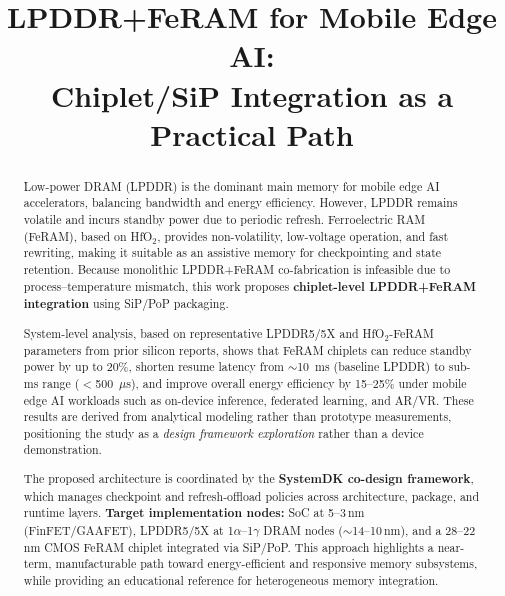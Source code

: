 \documentclass[10pt,conference]{IEEEtran}
\title{LPDDR+FeRAM for Mobile Edge AI:\\
Chiplet/SiP Integration as a Practical Path}
\author{%
  \IEEEauthorblockN{Shinichi Samizo}%
  \IEEEauthorblockA{Independent Semiconductor Researcher\\
  Former Engineer, Seiko Epson Corporation\\
  Email: \href{mailto:shin3t72@gmail.com}{shin3t72@gmail.com}\\
  GitHub: \href{https://github.com/Samizo-AITL}{Samizo-AITL}}%
}
\begin{document}
\maketitle

\begin{abstract}
Low-power DRAM (LPDDR) is the dominant main memory for mobile edge AI accelerators, balancing bandwidth and energy efficiency. 
However, LPDDR remains volatile and incurs standby power due to periodic refresh. 
Ferroelectric RAM (FeRAM), based on HfO$_2$, provides non-volatility, low-voltage operation, and fast rewriting, making it suitable as an assistive memory for checkpointing and state retention. 
Because monolithic LPDDR+FeRAM co-fabrication is infeasible due to process--temperature mismatch, this work proposes \textbf{chiplet-level LPDDR+FeRAM integration} using SiP/PoP packaging. 

System-level analysis, based on representative LPDDR5/5X and HfO$_2$-FeRAM parameters from prior silicon reports, shows that FeRAM chiplets can reduce standby power by up to 20\%, shorten resume latency from $\sim$10~ms (baseline LPDDR) to sub-ms range ($<$500~$\mu$s), and improve overall energy efficiency by 15--25\% under mobile edge AI workloads such as on-device inference, federated learning, and AR/VR. 
These results are derived from analytical modeling rather than prototype measurements, positioning the study as a \emph{design framework exploration} rather than a device demonstration.

The proposed architecture is coordinated by the \textbf{SystemDK co-design framework}, which manages checkpoint and refresh-offload policies across architecture, package, and runtime layers. 
\textbf{Target implementation nodes:} SoC at 5--3\,nm (FinFET/GAAFET), LPDDR5/5X at 1$\alpha$--1$\gamma$ DRAM nodes ($\sim$14--10\,nm), and a 28--22\,nm CMOS FeRAM chiplet integrated via SiP/PoP. 
This approach highlights a near-term, manufacturable path toward energy-efficient and responsive memory subsystems, while providing an educational reference for heterogeneous memory integration.
\end{abstract}







\balance
\vspace{1\baselineskip} %


\end{document}
